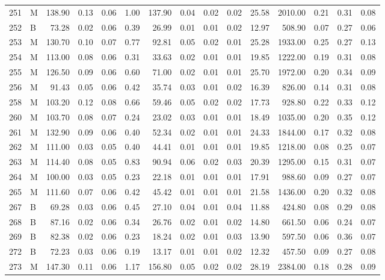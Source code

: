 \begin{table}[ht]
\begin{tabular}{rlrrrrrrrrrrrrr}
  251 & M & 138.90 & 0.13 & 0.06 & 1.00 & 137.90 & 0.04 & 0.02 & 0.02 & 25.58 & 2010.00 & 0.21 & 0.31 & 0.08 \\ 
  252 & B & 73.28 & 0.02 & 0.06 & 0.39 & 26.99 & 0.01 & 0.01 & 0.02 & 12.97 & 508.90 & 0.07 & 0.27 & 0.06 \\ 
  253 & M & 130.70 & 0.10 & 0.07 & 0.77 & 92.81 & 0.05 & 0.02 & 0.01 & 25.28 & 1933.00 & 0.25 & 0.27 & 0.13 \\ 
  254 & M & 113.00 & 0.08 & 0.06 & 0.31 & 33.63 & 0.02 & 0.01 & 0.01 & 19.85 & 1222.00 & 0.19 & 0.31 & 0.08 \\ 
  255 & M & 126.50 & 0.09 & 0.06 & 0.60 & 71.00 & 0.02 & 0.01 & 0.01 & 25.70 & 1972.00 & 0.20 & 0.34 & 0.09 \\ 
  256 & M & 91.43 & 0.05 & 0.06 & 0.42 & 35.74 & 0.03 & 0.01 & 0.02 & 16.39 & 826.00 & 0.14 & 0.31 & 0.08 \\ 
  258 & M & 103.20 & 0.12 & 0.08 & 0.66 & 59.46 & 0.05 & 0.02 & 0.02 & 17.73 & 928.80 & 0.22 & 0.33 & 0.12 \\ 
  260 & M & 103.70 & 0.08 & 0.07 & 0.24 & 23.02 & 0.03 & 0.01 & 0.01 & 18.49 & 1035.00 & 0.20 & 0.35 & 0.12 \\ 
  261 & M & 132.90 & 0.09 & 0.06 & 0.40 & 52.34 & 0.02 & 0.01 & 0.01 & 24.33 & 1844.00 & 0.17 & 0.32 & 0.08 \\ 
  262 & M & 111.00 & 0.03 & 0.05 & 0.40 & 44.41 & 0.01 & 0.01 & 0.01 & 19.85 & 1218.00 & 0.08 & 0.25 & 0.07 \\ 
  263 & M & 114.40 & 0.08 & 0.05 & 0.83 & 90.94 & 0.06 & 0.02 & 0.03 & 20.39 & 1295.00 & 0.15 & 0.31 & 0.07 \\ 
  264 & M & 100.00 & 0.03 & 0.05 & 0.23 & 22.18 & 0.01 & 0.01 & 0.01 & 17.91 & 988.60 & 0.09 & 0.27 & 0.07 \\ 
  265 & M & 111.60 & 0.07 & 0.06 & 0.42 & 45.42 & 0.01 & 0.01 & 0.01 & 21.58 & 1436.00 & 0.20 & 0.32 & 0.08 \\ 
  267 & B & 69.28 & 0.03 & 0.06 & 0.45 & 27.10 & 0.04 & 0.01 & 0.04 & 11.88 & 424.80 & 0.08 & 0.29 & 0.08 \\ 
  268 & B & 87.16 & 0.02 & 0.06 & 0.34 & 26.76 & 0.02 & 0.01 & 0.02 & 14.80 & 661.50 & 0.06 & 0.24 & 0.07 \\ 
  269 & B & 82.38 & 0.02 & 0.06 & 0.23 & 18.24 & 0.02 & 0.01 & 0.03 & 13.90 & 597.50 & 0.06 & 0.36 & 0.07 \\ 
  272 & B & 72.23 & 0.03 & 0.06 & 0.19 & 13.17 & 0.01 & 0.01 & 0.02 & 12.32 & 457.50 & 0.09 & 0.27 & 0.08 \\ 
  273 & M & 147.30 & 0.11 & 0.06 & 1.17 & 156.80 & 0.05 & 0.02 & 0.02 & 28.19 & 2384.00 & 0.18 & 0.28 & 0.09 \\ 

\end{tabular}
\end{table}

